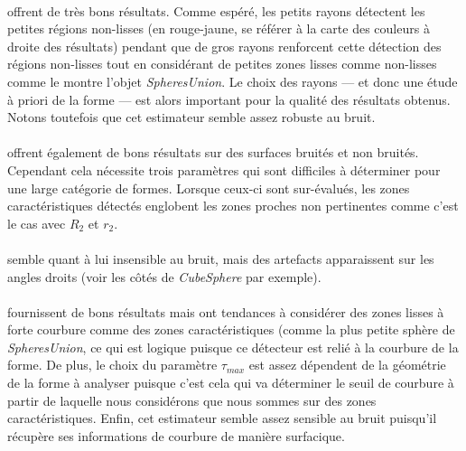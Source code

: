 \paragraph{}
%
 offrent de très bons résultats. Comme espéré, les petits
rayons détectent les petites régions non-lisses (en rouge-jaune, se référer à la
carte des couleurs à droite des résultats) pendant que de gros rayons renforcent
cette détection des régions non-lisses tout en considérant de petites zones
lisses comme non-lisses comme le montre l'objet \emph{SpheresUnion}. Le choix
des rayons --- et donc une étude à priori de la forme --- est alors important
pour la qualité des résultats obtenus. Notons toutefois que cet estimateur
semble assez robuste au bruit.
%
\paragraph{}
%
 offrent également de bons résultats sur des surfaces bruités
et non bruités. Cependant cela nécessite trois paramètres qui sont difficiles à
déterminer pour une large catégorie de formes. Lorsque ceux-ci sont sur-évalués,
les zones caractéristiques détectés englobent les zones proches non pertinentes
comme c'est le cas avec $R_2$ et $r_2$.
%
\paragraph{}
%
 semble quant à lui insensible au bruit, mais des artefacts
apparaissent sur les angles droits (voir les côtés de \emph{CubeSphere} par
exemple).
%
\paragraph{}
%
 fournissent de bons résultats mais ont tendances à considérer
des zones lisses à forte courbure comme des zones caractéristiques (comme la
plus petite sphère de \emph{SpheresUnion}, ce qui est logique puisque ce
détecteur est relié à la courbure de la forme. De plus, le choix du paramètre
$\tau_{max}$ est assez dépendent de la géométrie de la forme à analyser puisque
c'est cela qui va déterminer le seuil de courbure à partir de laquelle nous
considérons que nous sommes sur des zones caractéristiques. Enfin, cet
estimateur semble assez sensible au bruit puisqu'il récupère ses informations de
courbure de manière surfacique.
%
